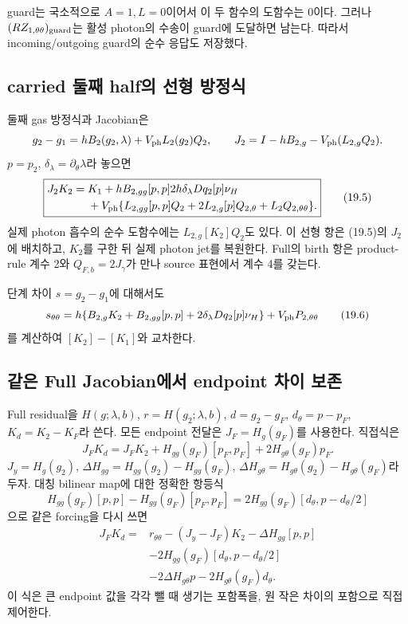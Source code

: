 guard는 국소적으로 $A=1,L=0$이어서 이 두 함수의 도함수는 0이다.
그러나 $(RZ_{1,\theta\theta})_{\rm guard}$는
활성 photon의 수송이 guard에 도달하면 남는다.
따라서 incoming/outgoing guard의 순수 응답도 저장했다.

\subsection{carried 둘째 half의 선형 방정식}
둘째 gas 방정식과 Jacobian은
\[
g_2-g_1=hB_2(g_2,\lambda)+V_{\rm ph}L_2(g_2)Q_2,\qquad
J_2=I-hB_{2,g}-V_{\rm ph}(L_{2,g}Q_2).
\]
$p=p_2$, $\delta_\lambda=\partial_\theta\lambda$라 놓으면
\[
\boxed{\begin{aligned}
J_2K_2={}&K_1+hB_{2,gg}[p,p]
2h\delta_\lambda Dq_2[p]\nu_H\\
&+V_{\rm ph}\{L_{2,gg}[p,p]Q_2
+2L_{2,g}[p]Q_{2,\theta}+L_2Q_{2,\theta\theta}\}.
\end{aligned}}
\tag{19.5}
\]
실제 photon 흡수의 순수 도함수에는
$L_{2,g}[K_2]Q_2$도 있다.
이 선형 항은 (19.5)의 $J_2$에 배치하고, $K_2$를 구한 뒤 실제 photon jet를 복원한다.
Full의 birth 항은 product-rule 계수 2와 $Q_{F,b}=2J_\gamma$가 만나
source 표현에서 계수 4를 갖는다.

단계 차이 $s=g_2-g_1$에 대해서도
\[
s_{\theta\theta}
=h\{B_{2,g}K_2+B_{2,gg}[p,p]
+2\delta_\lambda Dq_2[p]\nu_H\}+V_{\rm ph}P_{2,\theta\theta}
\tag{19.6}
\]
를 계산하여 $[K_2]-[K_1]$와 교차한다.

\subsection{같은 Full Jacobian에서 endpoint 차이 보존}
Full residual을 $H(g;\lambda,b)$,
$r=H(g_2;\lambda,b)$,
$d=g_2-g_F$,
$d_\theta=p-p_F$,
$K_d=K_2-K_F$라 쓴다.
모든 endpoint 전달은 $J_F=H_g(g_F)$를 사용한다.
직접식은
\[
J_FK_d=J_FK_2+H_{gg}(g_F)[p_F,p_F]+2H_{g\theta}(g_F)p_F.
\tag{19.7}
\]
$J_y=H_g(g_2)$,
$\Delta H_{gg}=H_{gg}(g_2)-H_{gg}(g_F)$,
$\Delta H_{g\theta}=H_{g\theta}(g_2)-H_{g\theta}(g_F)$라 두자.
대칭 bilinear map에 대한 정확한 항등식
\[
H_{gg}(g_F)[p,p]-H_{gg}(g_F)[p_F,p_F]
=2H_{gg}(g_F)[d_\theta,p-d_\theta/2]
\]
으로 같은 forcing을 다시 쓰면
\[
\boxed{\begin{aligned}
J_FK_d={}&r_{\theta\theta}-(J_y-J_F)K_2-\Delta H_{gg}[p,p]\\
&-2H_{gg}(g_F)[d_\theta,p-d_\theta/2]\\
&-2\Delta H_{g\theta}p-2H_{g\theta}(g_F)d_\theta.
\end{aligned}}
\tag{19.8}
\]
이 식은 큰 endpoint 값을 각각 뺄 때 생기는 포함폭을,
원 작은 차이의 포함으로 직접 제어한다.

